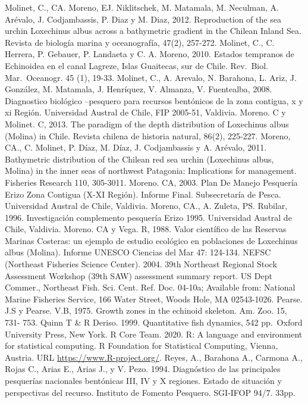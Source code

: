 \documentclass[
]{article}
\begin{document}
Molinet, C., CA. Moreno, EJ. Niklitschek, M. Matamala, M. Neculman, A.
Arévalo, J. Codjambassis, P. Diaz y M. Diaz, 2012. Reproduction of the
sea urchin Loxechinus albus across a bathymetric gradient in the Chilean
Inland Sea. Revista de biología marina y oceanografía, 47(2), 257-272.
Molinet, C., C. Herrera, P. Gebauer, P. Landaeta y C. A. Moreno, 2010.
Estados tempranos de Echinoidea en el canal Lagreze, Islas Guaitecas,
sur de Chile. Rev.~Biol. Mar.~Oceanogr. 45 (1), 19-33. Molinet, C., A.
Arevalo, N. Barahona, L. Ariz, J. González, M. Matamala, J. Henríquez,
V. Almanza, V. Fuentealba, 2008. Diagnostico biológico --pesquero para
recursos bentónicos de la zona contigua, x y xi Región. Universidad
Austral de Chile, FIP 2005-51, Valdivia. Moreno. C y Molinet. C, 2013.
The paradigm of the depth distribution of Loxechinus albus (Molina) in
Chile. Revista chilena de historia natural, 86(2), 225-227. Moreno, CA.,
C. Molinet, P. Díaz, M. Díaz, J. Codjambassis y A. Arévalo, 2011.
Bathymetric distribution of the Chilean red sea urchin (Loxechinus
albus, Molina) in the inner seas of northwest Patagonia: Implications
for management. Fisheries Research 110, 305-3011. Moreno. CA, 2003. Plan
De Manejo Pesquería Erizo Zona Contigua (X-XI Región). Informe Final.
Subsecretaría de Pesca. Universidad Austral de Chile, Valdivia. Moreno,
CA., A. Zuleta, PS. Rubilar, 1996. Investigación complemento pesquería
Erizo 1995. Universidad Austral de Chile, Valdivia. Moreno. CA y Vega.
R, 1988. Valor científico de las Reservas Marinas Costeras: un ejemplo
de estudio ecológico en poblaciones de Loxechinus albus (Molina).
Informe UNESCO Ciencias del Mar 47: 124-134. NEFSC (Northeast Fisheries
Science Center). 2004. 39th Northeast Regional Stock Assessment Workshop
(39th SAW) assessment summary report. US Dept Commer., Northeast Fish.
Sci. Cent. Ref. Doc. 04-10a; Available from: National Marine Fisheries
Service, 166 Water Street, Woods Hole, MA 02543-1026. Pearse. J.S y
Pearse. V.B, 1975. Growth zones in the echinoid skeleton. Am. Zoo. 15,
731- 753. Quinn T \& R Deriso. 1999. Quantitative fish dynamics, 542
pp.~Oxford University Press, New York. R Core Team. 2020. R: A language
and environment for statistical computing. R Foundation for Statistical
Computing, Vienna, Austria. URL \url{https://www.R-project.org/}. Reyes,
A., Barahona A., Carmona A., Rojas C., Arias E., Arias J., y V. Pezo.
1994. Diagnóstico de las principales pesquerías nacionales bentónicas
III, IV y X regiones. Estado de situación y perspectivas del recurso.
Instituto de Fomento Pesquero. SGI-IFOP 94/7. 33pp.
\end{document}
